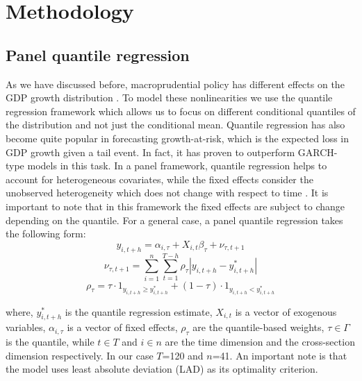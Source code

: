 \section{Methodology}
\subsection{Panel quantile regression}
As we have discussed before, macroprudential policy has different effects on the GDP growth distribution \citep{boar_2017}. To model these nonlinearities we use the quantile regression framework \citep{koenker_1978_regression} which allows us to focus on different conditional quantiles of the distribution and not just the conditional mean. Quantile regression has also become quite popular in forecasting growth-at-risk, which is the expected loss in GDP growth given a tail event. In fact, it has proven to outperform GARCH-type models \citep{kipriyanov_2022} in this task. In a panel framework, quantile regression helps to account for heterogeneous covariates, while the fixed effects consider the unobserved heterogeneity which does not change with respect to time \citep{galan2020}. It is important to note that in this framework the fixed effects are subject to change depending on the quantile. For a general case, a panel quantile regression takes the following form:
\begin{equation}
    \label{eq:panel_qr}
    y_{i,t+h} = \alpha_{i, \tau} + X_{i,t} \beta_\tau + \nu_{\tau,t+1}
\end{equation}
\begin{equation}
    \label{eq:panel_qr_loss}
    \nu_{\tau,t+1} = \sum_{i=1}^n \sum_{t=1}^{T-h}\rho_\tau| y_{i,t+h} -  y_{i,t+h}^*|
\end{equation}
\begin{equation}
    \label{eq:panel_qr_weights}
    \rho_\tau = \tau \cdot 1_{y_{i,t+h} \geq y_{i,t+h}^*} + (1-\tau) \cdot 1_{y_{i,t+h} < y_{i,t+h}^*}
\end{equation}

where, $y_{i,t+h}^*$ is the quantile regression estimate, $X_{i,t}$ is a vector of exogenous variables, $\alpha_{i, \tau}$ is a vector of fixed effects, $\rho_\tau$ are the quantile-based weights, $\tau\in\Gamma$ is the quantile, while $t\in T$ and $i\in n$ are the time dimension and the cross-section dimension respectively. In our case $T$=120 and $n$=41. An important note is that the model uses least absolute deviation (LAD) as its optimality criterion.

